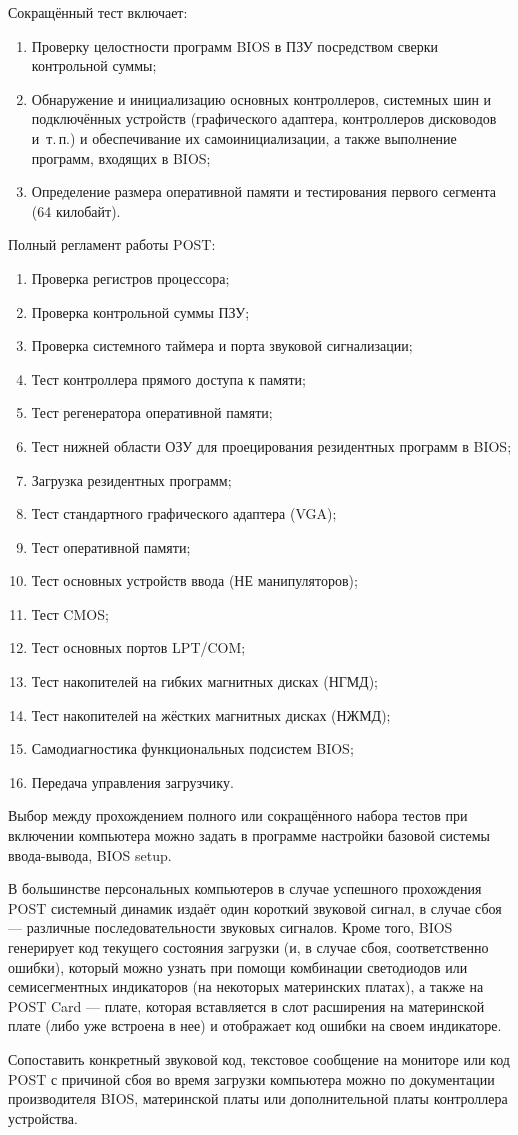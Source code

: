 Сокращённый тест включает:
\begin{enumerate}
 \item Проверку целостности программ BIOS в ПЗУ посредством сверки контрольной суммы;
 \item Обнаружение и инициализацию основных контроллеров, системных шин и подключённых устройств (графического адаптера, контроллеров дисководов и~т.\,п.) и обеспечивание их самоинициализации, а также выполнение программ, входящих в BIOS;
 \item Определение размера оперативной памяти и тестирования первого сегмента (64 килобайт).
\end{enumerate}

Полный регламент работы POST:
\begin{enumerate}
 \item Проверка регистров процессора;
 \item Проверка контрольной суммы ПЗУ;
 \item Проверка системного таймера и порта звуковой сигнализации;
 \item Тест контроллера прямого доступа к памяти;
 \item Тест регенератора оперативной памяти;
 \item Тест нижней области ОЗУ для проецирования резидентных программ в BIOS;
 \item Загрузка резидентных программ;
 \item Тест стандартного графического адаптера (VGA);
 \item Тест оперативной памяти;
 \item Тест основных устройств ввода (НЕ манипуляторов);
 \item Тест CMOS;
 \item Тест основных портов LPT/COM;
 \item Тест накопителей на гибких магнитных дисках (НГМД);
 \item Тест накопителей на жёстких магнитных дисках (НЖМД);
 \item Самодиагностика функциональных подсистем BIOS;
 \item Передача управления загрузчику.
\end{enumerate}

Выбор между прохождением полного или сокращённого набора тестов при включении компьютера можно задать в программе настройки базовой системы ввода-вывода, BIOS setup.

В большинстве персональных компьютеров в случае успешного прохождения POST системный динамик издаёт один короткий звуковой сигнал, в случае сбоя --- различные последовательности звуковых сигналов. Кроме того, BIOS генерирует код текущего состояния загрузки (и, в случае сбоя, соответственно ошибки), который можно узнать при помощи комбинации светодиодов или семисегментных индикаторов (на некоторых материнских платах), а также на POST Card --- плате, которая вставляется в слот расширения на материнской плате (либо уже встроена в нее) и отображает код ошибки на своем индикаторе.
 
Сопоставить конкретный звуковой код, текстовое сообщение на мониторе или код POST с причиной сбоя во время загрузки компьютера можно по документации производителя BIOS, материнской платы или дополнительной платы контроллера устройства.
